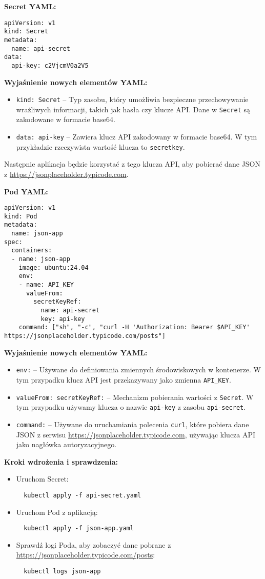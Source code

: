 \documentclass{article}
\begin{document}
\textbf{Secret YAML:}
\begin{lstlisting}
apiVersion: v1
kind: Secret
metadata:
  name: api-secret
data:
  api-key: c2VjcmV0a2V5
\end{lstlisting}

\textbf{Wyjaśnienie nowych elementów YAML:}
\begin{itemize}
  \item \texttt{kind: Secret} – Typ zasobu, który umożliwia bezpieczne przechowywanie wrażliwych informacji, takich jak hasła czy klucze API. Dane w \texttt{Secret} są zakodowane w formacie base64.
  \item \texttt{data: api-key} – Zawiera klucz API zakodowany w formacie base64. W tym przykładzie rzeczywista wartość klucza to \texttt{secretkey}.
\end{itemize}

Następnie aplikacja będzie korzystać z tego klucza API, aby pobierać dane JSON z \url{https://jsonplaceholder.typicode.com}.

\textbf{Pod YAML:}
\begin{lstlisting}
apiVersion: v1
kind: Pod
metadata:
  name: json-app
spec:
  containers:
  - name: json-app
    image: ubuntu:24.04
    env:
    - name: API_KEY
      valueFrom:
        secretKeyRef:
          name: api-secret
          key: api-key
    command: ["sh", "-c", "curl -H 'Authorization: Bearer $API_KEY' https://jsonplaceholder.typicode.com/posts"]
\end{lstlisting}

\textbf{Wyjaśnienie nowych elementów YAML:}
\begin{itemize}
  \item \texttt{env:} – Używane do definiowania zmiennych środowiskowych w kontenerze. W tym przypadku klucz API jest przekazywany jako zmienna \texttt{API\_KEY}.
  \item \texttt{valueFrom: secretKeyRef:} – Mechanizm pobierania wartości z \texttt{Secret}. W tym przypadku używamy klucza o nazwie \texttt{api-key} z zasobu \texttt{api-secret}.
  \item \texttt{command:} – Używane do uruchamiania polecenia \texttt{curl}, które pobiera dane JSON z serwisu \url{https://jsonplaceholder.typicode.com}, używając klucza API jako nagłówka autoryzacyjnego.
\end{itemize}

\textbf{Kroki wdrożenia i sprawdzenia:}
\begin{itemize}
  \item Uruchom Secret:
  \begin{lstlisting}
  kubectl apply -f api-secret.yaml
  \end{lstlisting}
  \item Uruchom Pod z aplikacją:
  \begin{lstlisting}
  kubectl apply -f json-app.yaml
  \end{lstlisting}
  \item Sprawdź logi Poda, aby zobaczyć dane pobrane z \url{https://jsonplaceholder.typicode.com/posts}:
  \begin{lstlisting}
  kubectl logs json-app
  \end{lstlisting}
\end{itemize}
\end{document}

